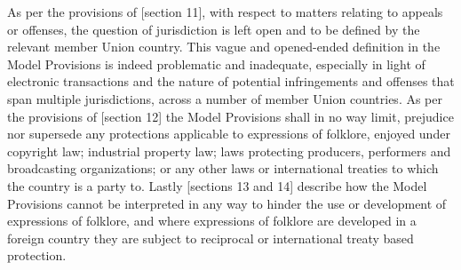 \documentclass[11pt]{article}
\begin{document}
As per the provisions of [section
11]\cite{wipo85_model_provi_national_laws_folklore}, with respect to matters
relating to appeals or offenses, the question of jurisdiction is left open and
to be defined by the relevant member Union country. This vague and opened-ended
definition in the Model Provisions is indeed problematic and inadequate,
especially in light of electronic transactions and the nature of potential
infringements and offenses that span multiple jurisdictions, across a number of
member Union countries. As per the provisions of [section
12]\cite{wipo85_model_provi_national_laws_folklore} the Model Provisions shall in
no way limit, prejudice nor supersede any protections applicable to expressions
of folklore, enjoyed under copyright law; industrial property law; laws
protecting producers, performers and broadcasting organizations; or any other
laws or international treaties to which the country is a party to. Lastly
[sections 13 and 14]\cite{wipo85_model_provi_national_laws_folklore} describe how
the Model Provisions cannot be interpreted in any way to hinder the use or
development of expressions of folklore, and where expressions of folklore are
developed in a foreign country they are subject to reciprocal or international
treaty based protection.


\printbibliography
\end{document}
